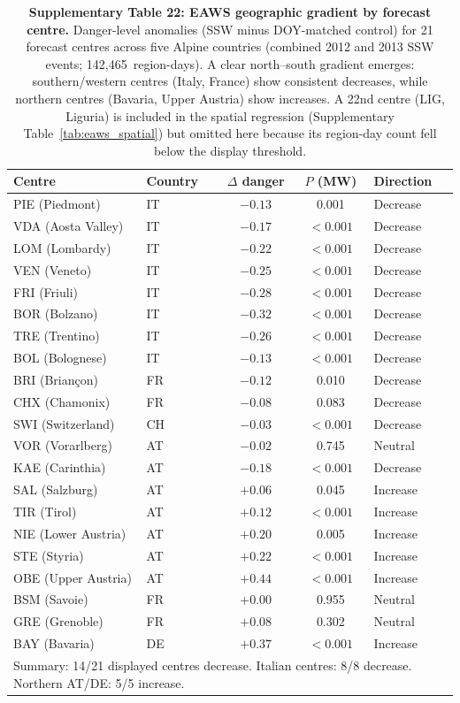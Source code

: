 \documentclass[11pt,letterpaper]{article}
\begin{document}
\begin{table}[!ht]
\centering
\caption{\textbf{Supplementary Table 22: EAWS geographic gradient by forecast centre.}
Danger-level anomalies (SSW minus DOY-matched control) for 21 forecast centres across five Alpine countries (combined 2012 and 2013 SSW events; 142,465~region-days). A clear north--south gradient emerges: southern/western centres (Italy, France) show consistent decreases, while northern centres (Bavaria, Upper Austria) show increases. A 22nd centre (LIG, Liguria) is included in the spatial regression (Supplementary Table~\ref{tab:eaws_spatial}) but omitted here because its region-day count fell below the display threshold.}
\label{tab:eaws_gradient}
\small
\begin{tabular}{llccl}
\toprule
Centre & Country & $\Delta$ danger & $P$ (MW) & Direction \\
\midrule
PIE (Piedmont) & IT & $-0.13$ & 0.001 & Decrease \\
VDA (Aosta Valley) & IT & $-0.17$ & $< 0.001$ & Decrease \\
LOM (Lombardy) & IT & $-0.22$ & $< 0.001$ & Decrease \\
VEN (Veneto) & IT & $-0.25$ & $< 0.001$ & Decrease \\
FRI (Friuli) & IT & $-0.28$ & $< 0.001$ & Decrease \\
BOR (Bolzano) & IT & $-0.32$ & $< 0.001$ & Decrease \\
TRE (Trentino) & IT & $-0.26$ & $< 0.001$ & Decrease \\
BOL (Bolognese) & IT & $-0.13$ & $< 0.001$ & Decrease \\
BRI (Briançon) & FR & $-0.12$ & 0.010 & Decrease \\
CHX (Chamonix) & FR & $-0.08$ & 0.083 & Decrease \\
SWI (Switzerland) & CH & $-0.03$ & $< 0.001$ & Decrease \\
VOR (Vorarlberg) & AT & $-0.02$ & 0.745 & Neutral \\
KAE (Carinthia) & AT & $-0.18$ & $< 0.001$ & Decrease \\
SAL (Salzburg) & AT & $+0.06$ & 0.045 & Increase \\
TIR (Tirol) & AT & $+0.12$ & $< 0.001$ & Increase \\
NIE (Lower Austria) & AT & $+0.20$ & 0.005 & Increase \\
STE (Styria) & AT & $+0.22$ & $< 0.001$ & Increase \\
OBE (Upper Austria) & AT & $+0.44$ & $< 0.001$ & Increase \\
BSM (Savoie) & FR & $+0.00$ & 0.955 & Neutral \\
GRE (Grenoble) & FR & $+0.08$ & 0.302 & Neutral \\
BAY (Bavaria) & DE & $+0.37$ & $< 0.001$ & Increase \\
\bottomrule
\multicolumn{5}{l}{\footnotesize Summary: 14/21 displayed centres decrease. Italian centres: 8/8 decrease. Northern AT/DE: 5/5 increase.}
\end{tabular}
\end{table}
\end{document}
